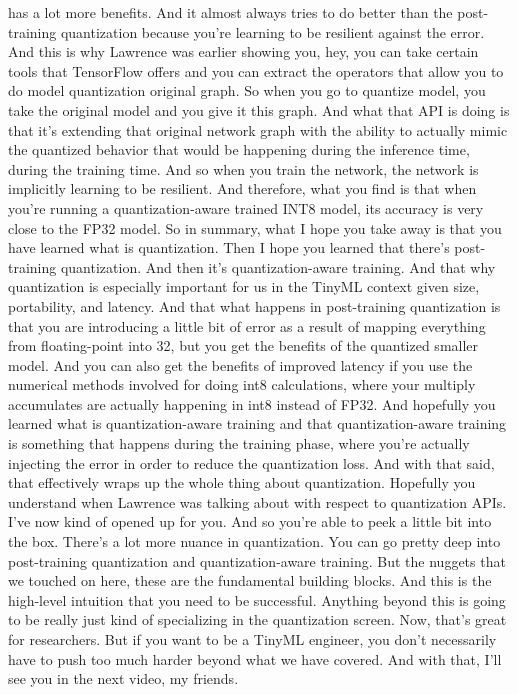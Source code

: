 has a lot more benefits.
And it almost always tries to do better than the post-training quantization
because you're learning to be resilient against the error.
And this is why Lawrence was earlier showing you,
hey, you can take certain tools that TensorFlow offers
and you can extract the operators that allow you to do model quantization
original graph.
So when you go to quantize model, you take the original model
and you give it this graph.
And what that API is doing is that it's extending that original network
graph with the ability to actually mimic the quantized behavior that
would be happening during the inference time, during the training time.
And so when you train the network, the network
is implicitly learning to be resilient.
And therefore, what you find is that when
you're running a quantization-aware trained INT8 model,
its accuracy is very close to the FP32 model.
So in summary, what I hope you take away is
that you have learned what is quantization.
Then I hope you learned that there's post-training quantization.
And then it's quantization-aware training.
And that why quantization is especially important for us
in the TinyML context given size, portability, and latency.
And that what happens in post-training quantization
is that you are introducing a little bit of error
as a result of mapping everything from floating-point into 32,
but you get the benefits of the quantized smaller model.
And you can also get the benefits of improved latency
if you use the numerical methods involved for doing int8 calculations,
where your multiply accumulates are actually
happening in int8 instead of FP32.
And hopefully you learned what is quantization-aware training
and that quantization-aware training is something
that happens during the training phase, where you're actually
injecting the error in order to reduce the quantization loss.
And with that said, that effectively wraps up
the whole thing about quantization.
Hopefully you understand when Lawrence was talking about with respect
to quantization APIs.
I've now kind of opened up for you.
And so you're able to peek a little bit into the box.
There's a lot more nuance in quantization.
You can go pretty deep into post-training quantization
and quantization-aware training.
But the nuggets that we touched on here, these
are the fundamental building blocks.
And this is the high-level intuition that you need to be successful.
Anything beyond this is going to be really just kind of specializing
in the quantization screen.
Now, that's great for researchers.
But if you want to be a TinyML engineer, you
don't necessarily have to push too much harder beyond what we have covered.
And with that, I'll see you in the next video, my friends.

